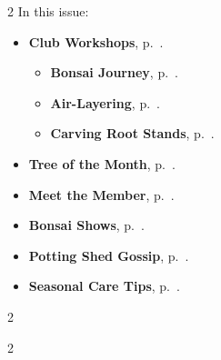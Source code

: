 \setlength{\columnsep}{-5.0cm}
\begin{multicols}{2}
    \noindent\textsf{In this issue:}
    \begin{itemize}
        \item \textsf{\textbf{Club Workshops}}, p.~\pageref{2025-05-marktalk}.
        \begin{itemize}
            \item \textsf{\textbf{Bonsai Journey}}, p.~\pageref{2025-05-marktalk}.
            \item \textsf{\textbf{Air\--Layering}}, p.~\pageref{2025-05-layers}.
            \item \textsf{\textbf{Carving Root Stands}}, p.~\pageref{2025-05-rootstands}.
        \end{itemize}
        \item \textsf{\textbf{Tree of the Month}}, p.~\pageref{2025-05-contest}.
        \item \textsf{\textbf{Meet the Member}}, p.~\pageref{2025-05-roots}.
        \item \textsf{\textbf{Bonsai Shows}}, p.~\pageref{2025-05-show}.
        \item \textsf{\textbf{Potting Shed Gossip}}, p.~\pageref{2025-05-gossip}.
        \item \textsf{\textbf{Seasonal Care Tips}}, p.~\pageref{2025-05-care}.
    \end{itemize}
    \vfill\null
    \columnbreak

    
\end{multicols}
\pagebreak

\setlength{\columnsep}{0.5cm}
\begin{multicols}{2}
    
    
    
    
%    
%    
    
    
\end{multicols}

\begin{multicols}{2}
    
    
%    
\end{multicols}
